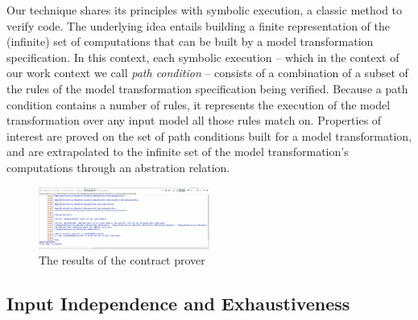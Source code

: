 Our technique shares its principles with symbolic execution, a classic method to
verify code. The underlying idea entails building a finite representation of the
(infinite) set of computations that can be built by a model transformation
specification. In this context, each symbolic execution -- which in the context
of our work context we call \emph{path condition} -- consists of a combination
of a subset of the rules of the model transformation specification being verified.
Because a path condition contains a number of rules, it represents the execution
of the model transformation over any input model all those rules match on.
Properties of interest are proved on the set of path conditions built for a
model transformation, and are extrapolated to the infinite set of
the model transformation's computations through an abstration relation.




\begin{figure}
\centering
\includegraphics[width=0.5\textwidth]{figures/output}
\caption{The results of the contract prover}
\label{fig:output}
\end{figure}

\subsection{Input Independence and Exhaustiveness} 

